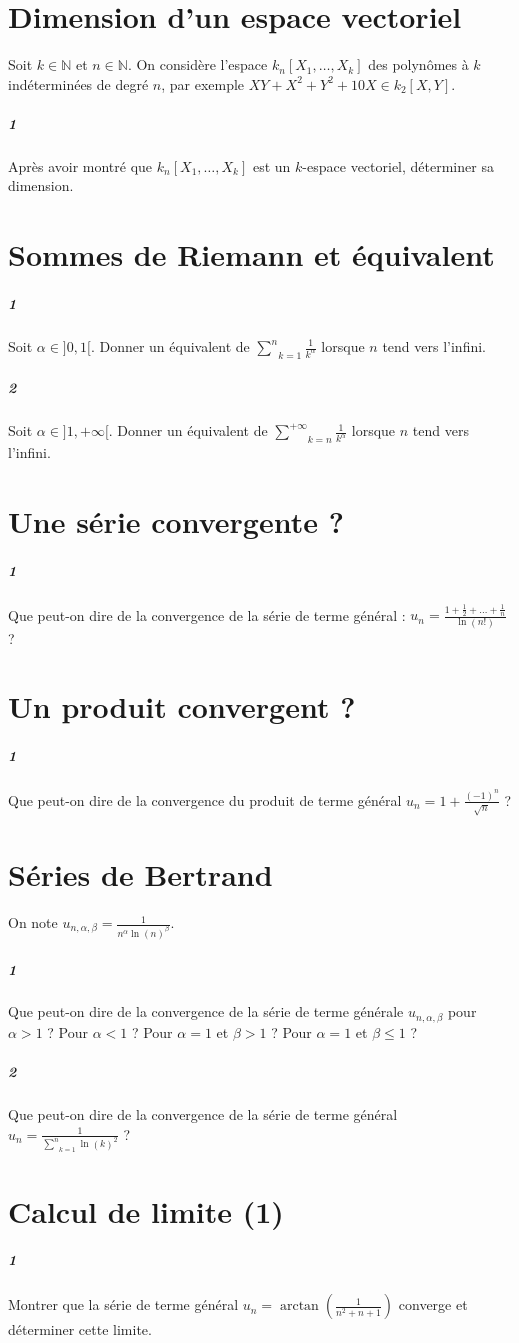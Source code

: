 \documentclass[10pt,a4paper]{article}
\begin{document}
\section{Dimension d'un espace vectoriel}
Soit $k \in \mathbb{N}$ et $n \in \mathbb{N}$. On considère l'espace $k_n[X_1, \dots, X_k]$ des polynômes à $k$ indéterminées de degré $n$, par exemple $XY +X^2+Y^2+10X \in k_2[X,Y]$.
\subparagraph{1}Après avoir montré que $k_n[X_1, \dots, X_k]$ est un $k$-espace vectoriel, déterminer sa dimension.



\section{Sommes de Riemann et équivalent}
\subparagraph{1} Soit $\alpha \in ]0,1[$. Donner un équivalent de $\underset{k=1}{\overset{n}{\sum}} \frac{1}{k^{\alpha}}$ lorsque $n$ tend vers l'infini.
\subparagraph{2} Soit $\alpha \in ]1,+\infty[$. Donner un équivalent de $\underset{k=n}{\overset{+\infty}{\sum}} \frac{1}{k^{\alpha}}$ lorsque $n$ tend vers l'infini.

\section{Une série convergente ?}
\subparagraph{1}Que peut-on dire de la convergence de la série de terme général : $u_n = \frac{1+ \frac{1}{2}+ \dots + \frac{1}{n}}{\ln(n!)}$ ?

\section{Un produit convergent ?}
\subparagraph{1}Que peut-on dire de la convergence du produit de terme général $u_n = 1+ \frac{(-1)^n}{\sqrt{n}}$ ?

\section{Séries de Bertrand}
On note $u_{n,\alpha,\beta} = \frac{1}{n^{\alpha} \ln(n) ^{\beta}}$.
\subparagraph{1}Que peut-on dire de la convergence de la série de terme générale $u_{n, \alpha, \beta}$ pour $\alpha>1$ ? Pour $\alpha <1$ ? Pour $\alpha=1$ et $\beta>1$ ? Pour $\alpha=1$ et $\beta \le 1$ ?
\subparagraph{2}Que peut-on dire de la convergence de la série de terme général $u_n = \frac{1}{\underset{k=1}{\overset{n}{\sum}}\ln(k)^2}$ ?

\section{Calcul de limite (1)}
\subparagraph{1}Montrer que la série de terme général $u_n = \arctan \left( \frac{1}{n^2+n+1} \right)$ converge et déterminer cette limite.
\end{document}
